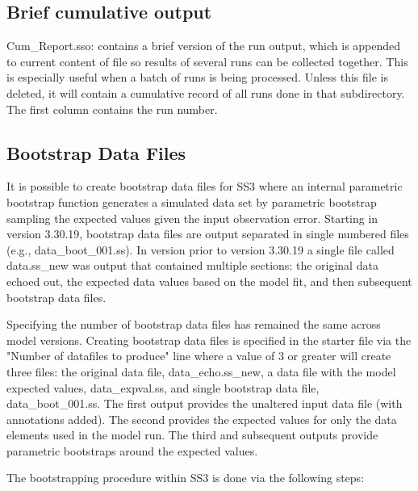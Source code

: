 \subsection{Brief cumulative output}
Cum\_Report.sso: contains a brief version of the run output, which is appended to current content of file so results of several runs can be collected together. This is especially useful when a batch of runs is being processed. Unless this file is deleted, it will contain a cumulative record of all runs done in that subdirectory. The first column contains the run number.  

\hypertarget{bootstrap}{}
\subsection{Bootstrap Data Files}
It is possible to create bootstrap data files for SS3 where an internal parametric bootstrap function generates a simulated data set by parametric bootstrap sampling the expected values given the input observation error. Starting in version 3.30.19, bootstrap data files are output separated in single numbered files (e.g., data\_boot\_001.ss). In version prior to version 3.30.19 a single file called data.ss\_new was output that contained multiple sections:  the original data echoed out, the expected data values based on the model fit, and then subsequent bootstrap data files. 

Specifying the number of bootstrap data files has remained the same across model versions.  Creating bootstrap data files is specified in the starter file via the "Number of datafiles to produce" line where a value of 3 or greater will create three files: the original data file, data\_echo.ss\_new, a data file with the model expected values, data\_expval.ss, and single bootstrap data file, data\_boot\_001.ss.  The first output provides the unaltered input data file (with annotations added).  The second provides the expected values for only the data elements used in the model run.  The third and subsequent outputs provide parametric bootstraps around the expected values. 

The bootstrapping procedure within SS3 is done via the following steps:

